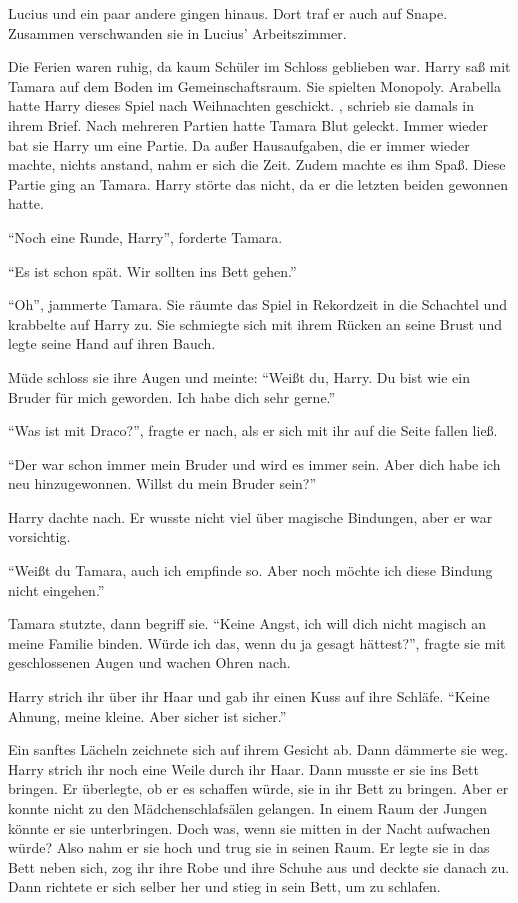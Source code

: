 Lucius und ein paar andere gingen hinaus. Dort traf er auch auf Snape. Zusammen verschwanden sie in Lucius’ Arbeitszimmer.

\trenn

Die Ferien waren ruhig, da kaum Schüler im Schloss geblieben war. Harry saß mit Tamara auf dem Boden im Gemeinschaftsraum. Sie spielten Monopoly. Arabella hatte Harry dieses Spiel nach Weihnachten geschickt. , schrieb sie damals in ihrem Brief. Nach mehreren Partien hatte Tamara Blut geleckt. Immer wieder bat sie Harry um eine Partie. Da außer Hausaufgaben, die er immer wieder machte, nichts anstand, nahm er sich die Zeit. Zudem machte es ihm Spaß. Diese Partie ging an Tamara. Harry störte das nicht, da er die letzten beiden gewonnen hatte.

\enquote{Noch eine Runde, Harry}, forderte Tamara.

\enquote{Es ist schon spät. Wir sollten ins Bett gehen.}

\enquote{Oh}, jammerte Tamara. Sie räumte das Spiel in Rekordzeit in die Schachtel und krabbelte auf Harry zu. Sie schmiegte sich mit ihrem Rücken an seine Brust und legte seine Hand  auf ihren Bauch.

Müde schloss sie ihre Augen und meinte: \enquote{Weißt du, Harry. Du bist wie ein Bruder für mich geworden. Ich habe dich sehr gerne.}

\enquote{Was ist mit Draco?}, fragte er nach, als er sich mit ihr auf die Seite fallen ließ.

\enquote{Der war schon immer mein Bruder und wird es immer sein. Aber dich habe ich neu hinzugewonnen. Willst du mein Bruder sein?}

Harry dachte nach. Er wusste nicht viel über magische Bindungen, aber er war vorsichtig.

\enquote{Weißt du Tamara, auch ich empfinde so. Aber noch möchte ich diese Bindung nicht eingehen.}

Tamara stutzte, dann begriff sie. \enquote{Keine Angst, ich will dich nicht magisch an meine Familie binden. \gst Würde ich das, wenn du ja gesagt hättest?}, fragte sie mit geschlossenen Augen und wachen Ohren nach.

Harry strich ihr über ihr Haar und gab ihr einen Kuss auf ihre Schläfe. \enquote{Keine Ahnung, meine kleine. Aber sicher ist sicher.}

Ein sanftes Lächeln zeichnete sich auf ihrem Gesicht ab. Dann dämmerte sie weg. Harry strich ihr noch eine Weile durch ihr Haar. Dann musste er sie ins Bett bringen. Er überlegte, ob er es schaffen würde, sie in ihr Bett zu bringen. Aber er konnte nicht zu den Mädchenschlafsälen gelangen. In einem Raum der Jungen könnte er sie unterbringen. Doch was, wenn sie mitten in der Nacht aufwachen würde? Also nahm er sie hoch und trug sie in seinen Raum. Er legte sie in das Bett neben sich, zog ihr ihre Robe und ihre Schuhe aus und deckte sie danach zu. Dann richtete er sich selber her und stieg in sein Bett, um zu schlafen.

